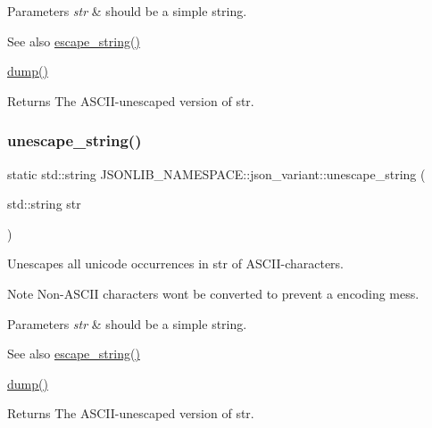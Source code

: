 \begin{DoxyParams}{Parameters}
{\em str} & should be a simple string. \\
\hline
\end{DoxyParams}
\begin{DoxySeeAlso}{See also}
\hyperlink{classJSONLIB__NAMESPACE_1_1json__variant_a4c2354098f97b91b5a07dbda981673cf}{escape\+\_\+string()} 

\hyperlink{classJSONLIB__NAMESPACE_1_1json__variant_a72d4a39d77b76f076354219edc6ea4a0}{dump()} 
\end{DoxySeeAlso}
\begin{DoxyReturn}{Returns}
The A\+S\+C\+I\+I-\/unescaped version of {\ttfamily str}. 
\end{DoxyReturn}
\mbox{\label{classJSONLIB__NAMESPACE_1_1json__variant_ab41402ea9062a5c4688834e734486646}} 
\subsubsection{\texorpdfstring{unescape\+\_\+string()}{unescape\_string()}\hspace{0.1cm}{\footnotesize\ttfamily [2/2]}}
{\footnotesize\ttfamily static std\+::string J\+S\+O\+N\+L\+I\+B\+\_\+\+N\+A\+M\+E\+S\+P\+A\+C\+E\+::json\+\_\+variant\+::unescape\+\_\+string (\begin{DoxyParamCaption}\item[{std\+::string}]{str }\end{DoxyParamCaption})\hspace{0.3cm}{\ttfamily [static]}}



Unescapes all unicode occurrences in {\ttfamily str} of A\+S\+C\+I\+I-\/characters. 

\begin{DoxyNote}{Note}
Non-\/\+A\+S\+C\+II characters won\textquotesingle{}t be converted to prevent a encoding mess. 
\end{DoxyNote}

\begin{DoxyParams}{Parameters}
{\em str} & should be a simple string. \\
\hline
\end{DoxyParams}
\begin{DoxySeeAlso}{See also}
\hyperlink{classJSONLIB__NAMESPACE_1_1json__variant_a4c2354098f97b91b5a07dbda981673cf}{escape\+\_\+string()} 

\hyperlink{classJSONLIB__NAMESPACE_1_1json__variant_a72d4a39d77b76f076354219edc6ea4a0}{dump()} 
\end{DoxySeeAlso}
\begin{DoxyReturn}{Returns}
The A\+S\+C\+I\+I-\/unescaped version of {\ttfamily str}. 
\end{DoxyReturn}


